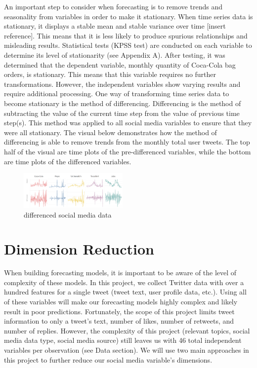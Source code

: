 \documentclass[12pt,oneside]{chicagocapstone}
\begin{document}
An important step to consider when forecasting is to remove trends and seasonality from variables in order to make it stationary. When time series data is stationary, it displays a stable mean and stable variance over time {[}insert reference{]}. This means that it is less likely to produce spurious relationships and misleading results. Statistical tests (KPSS test) are conducted on each variable to determine its level of stationarity (see Appendix A). After testing, it was determined that the dependent variable, monthly quantity of Coca-Cola bag orders, is stationary. This means that this variable requires no further transformations. However, the independent variables show varying results and require additional processing. One way of transforming time series data to become stationary is the method of differencing. Differencing is the method of subtracting the value of the current time step from the value of previous time step(s). This method was applied to all social media variables to ensure that they were all stationary. The visual below demonstrates how the method of differencing is able to remove trends from the monthly total user tweets. The top half of the visual are time plots of the pre-differenced variables, while the bottom are time plots of the differenced variables.
\begin{figure}

{\centering \includegraphics[width=200px]{figure/differencing} 

}

\caption{differenced social media data}\label{fig:differencing}
\end{figure}
\hypertarget{dimension-reduction}{%
\section*{Dimension Reduction}\label{dimension-reduction}}

When building forecasting models, it is important to be aware of the level of complexity of these models. In this project, we collect Twitter data with over a hundred features for a single tweet (tweet text, user profile data, etc.). Using all of these variables will make our forecasting models highly complex and likely result in poor predictions. Fortunately, the scope of this project limits tweet information to only a tweet's text, number of likes, number of retweets, and number of replies. However, the complexity of this project (relevant topics, social media data type, social media source) still leaves us with 46 total independent variables per observation (see Data section). We will use two main approaches in this project to further reduce our social media variable's dimensions.
\end{document}
